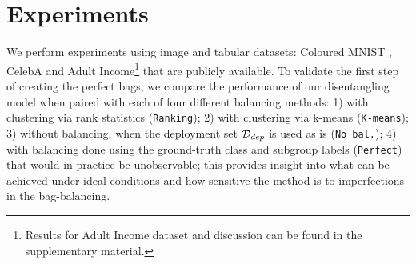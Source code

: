 

\section{Experiments}
We perform experiments using image and tabular datasets: Coloured MNIST \citep{kim2019learning}, CelebA \citep{liu2015faceattributes} and Adult Income\footnote{{Results for Adult Income dataset and discussion can be found in the supplementary material.}} \citep{Dua:2017} that are publicly available. 
%
To validate the first step of creating the perfect bags, we compare the performance of our disentangling model when paired with each of four different balancing methods:
1) with clustering via rank statistics (\texttt{Ranking});
2) with clustering via k-means (\texttt{K-means}); 
3) without balancing, when the deployment set ${\mathcal{D}}_{dep}$ is used as is (\texttt{No bal.});
4) with balancing done using the ground-truth class and subgroup labels (\texttt{Perfect}) that would in practice be unobservable; this provides insight into what can be achieved under ideal conditions and how sensitive the method is to imperfections in the bag-balancing.
 
